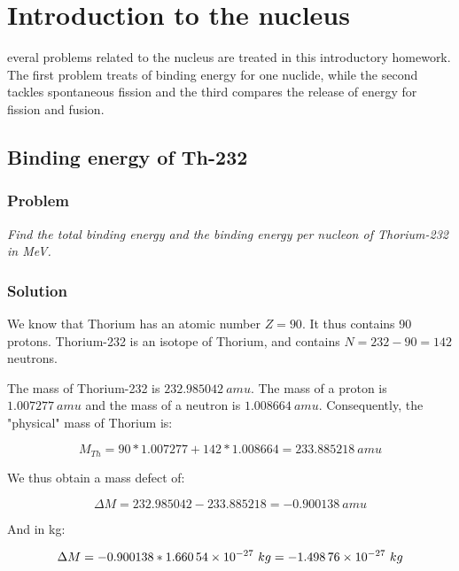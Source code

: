 %
%
\let\textcircled=\pgftextcircled
\chapter{Introduction to the nucleus}
\label{chap:intro}

everal problems related to the nucleus are treated in this introductory homework. The first problem treats of binding energy for one nuclide, while the second tackles spontaneous fission and the third compares the release of energy for fission and fusion.

\section{Binding energy of Th-232}
\label{prob11}


\subsection{Problem}
\textit{Find the total binding energy and the binding energy per nucleon of Thorium-232 in MeV.}

\subsection{Solution}

We know that Thorium has an atomic number $Z=90$. It thus contains 90 protons. Thorium-232 is an isotope of Thorium, and contains $N = 232 - 90 = 142$ neutrons.

The mass of Thorium-232 is $232.985042\ amu$. The mass of a proton is $1.007277\ amu$ and the mass of a neutron is $1.008664\ amu$. Consequently, the "physical" mass of Thorium is:

\begin{equation}
M_{Th} = 90*1.007277 + 142*1.008664 = 233.885218\ amu
\end{equation}

We thus obtain a mass defect of:

\begin{equation}
\Delta M = 232.985042 - 233.885218 = - 0.900138\ amu
\end{equation}

And in kg:

\begin{equation}
\Delta M = - 0.900138 * \text{\num{1.66054e-27}}\ kg = -\text{\num{1.49876e-27}}\ kg
\end{equation}

